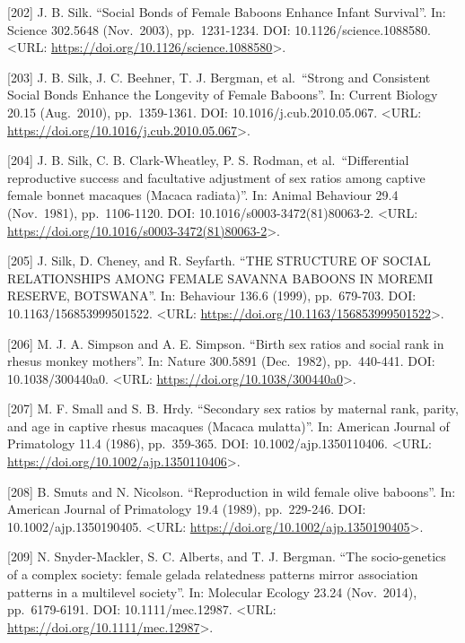 \documentclass[
]{article}
\begin{document}
{[}202{]} J. B. Silk. ``Social Bonds of Female Baboons Enhance Infant
Survival''. In: Science 302.5648 (Nov.~2003), pp.~1231-1234. DOI:
10.1126/science.1088580. \textless URL:
\url{https://doi.org/10.1126/science.1088580}\textgreater.

{[}203{]} J. B. Silk, J. C. Beehner, T. J. Bergman, et al.~``Strong and
Consistent Social Bonds Enhance the Longevity of Female Baboons''. In:
Current Biology 20.15 (Aug.~2010), pp.~1359-1361. DOI:
10.1016/j.cub.2010.05.067. \textless URL:
\url{https://doi.org/10.1016/j.cub.2010.05.067}\textgreater.

{[}204{]} J. B. Silk, C. B. Clark-Wheatley, P. S. Rodman, et
al.~``Differential reproductive success and facultative adjustment of
sex ratios among captive female bonnet macaques (Macaca radiata)''. In:
Animal Behaviour 29.4 (Nov.~1981), pp.~1106-1120. DOI:
10.1016/s0003-3472(81)80063-2. \textless URL:
\url{https://doi.org/10.1016/s0003-3472(81)80063-2}\textgreater.

{[}205{]} J. Silk, D. Cheney, and R. Seyfarth. ``THE STRUCTURE OF SOCIAL
RELATIONSHIPS AMONG FEMALE SAVANNA BABOONS IN MOREMI RESERVE,
BOTSWANA''. In: Behaviour 136.6 (1999), pp.~679-703. DOI:
10.1163/156853999501522. \textless URL:
\url{https://doi.org/10.1163/156853999501522}\textgreater.

{[}206{]} M. J. A. Simpson and A. E. Simpson. ``Birth sex ratios and
social rank in rhesus monkey mothers''. In: Nature 300.5891 (Dec.~1982),
pp.~440-441. DOI: 10.1038/300440a0. \textless URL:
\url{https://doi.org/10.1038/300440a0}\textgreater.

{[}207{]} M. F. Small and S. B. Hrdy. ``Secondary sex ratios by maternal
rank, parity, and age in captive rhesus macaques (Macaca mulatta)''. In:
American Journal of Primatology 11.4 (1986), pp.~359-365. DOI:
10.1002/ajp.1350110406. \textless URL:
\url{https://doi.org/10.1002/ajp.1350110406}\textgreater.

{[}208{]} B. Smuts and N. Nicolson. ``Reproduction in wild female olive
baboons''. In: American Journal of Primatology 19.4 (1989), pp.~229-246.
DOI: 10.1002/ajp.1350190405. \textless URL:
\url{https://doi.org/10.1002/ajp.1350190405}\textgreater.

{[}209{]} N. Snyder-Mackler, S. C. Alberts, and T. J. Bergman. ``The
socio-genetics of a complex society: female gelada relatedness patterns
mirror association patterns in a multilevel society''. In: Molecular
Ecology 23.24 (Nov.~2014), pp.~6179-6191. DOI: 10.1111/mec.12987.
\textless URL: \url{https://doi.org/10.1111/mec.12987}\textgreater.
\end{document}
